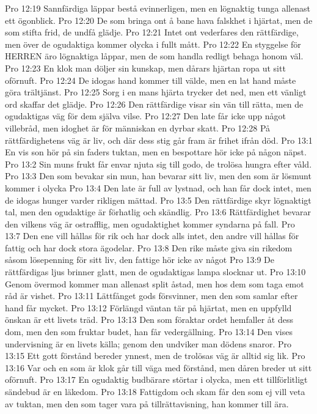 Pro 12:19  Sannfärdiga läppar bestå evinnerligen, men en lögnaktig tunga allenast ett ögonblick.
Pro 12:20  De som bringa ont å bane hava falskhet i hjärtat, men de som stifta frid, de undfå glädje.
Pro 12:21  Intet ont vederfares den rättfärdige, men över de ogudaktiga kommer olycka i fullt mått.
Pro 12:22  En styggelse för HERREN äro lögnaktiga låppar, men de som handla redligt behaga honom väl.
Pro 12:23  En klok man döljer sin kunskap, men dårars hjärtan ropa ut sitt oförnuft.
Pro 12:24  De idogas hand kommer till välde, men en lat hand måste göra trältjänst.
Pro 12:25  Sorg i en mans hjärta trycker det ned, men ett vänligt ord skaffar det glädje.
Pro 12:26  Den rättfärdige visar sin vän till rätta, men de ogudaktigas väg för dem själva vilse.
Pro 12:27  Den late får icke upp något villebråd, men idoghet är för människan en dyrbar skatt.
Pro 12:28  På rättfärdighetens väg är liv, och där dess stig går fram är frihet ifrån död.
Pro 13:1  En vis son hör på sin faders tuktan, men en bespottare hör icke på någon näpst.
Pro 13:2  Sin muns frukt får envar njuta sig till godo, de trolösa hungra efter våld.
Pro 13:3  Den som bevakar sin mun, han bevarar sitt liv, men den som är lösmunt kommer i olycka
Pro 13:4  Den late är full av lystnad, och han får dock intet, men de idogas hunger varder rikligen mättad.
Pro 13:5  Den rättfärdige skyr lögnaktigt tal, men den ogudaktige är förhatlig och skändlig.
Pro 13:6  Rättfärdighet bevarar den vilkens väg är ostrafflig, men ogudaktighet kommer syndarna på fall.
Pro 13:7  Den ene vill hållas för rik och har dock alls intet, den andre vill hållas för fattig och har dock stora ägodelar.
Pro 13:8  Den rike måste giva sin rikedom såsom lösepenning för sitt liv, den fattige hör icke av något
Pro 13:9  De rättfärdigas ljus brinner glatt, men de ogudaktigas lampa slocknar ut.
Pro 13:10  Genom övermod kommer man allenast split åstad, men hos dem som taga emot råd är vishet.
Pro 13:11  Lättfånget gods försvinner, men den som samlar efter hand får mycket.
Pro 13:12  Förlängd väntan tär på hjärtat, men en uppfylld önskan är ett livets träd.
Pro 13:13  Den som föraktar ordet hemfaller åt dess dom, men den som fruktar budet, han får vedergällning.
Pro 13:14  Den vises undervisning är en livets källa; genom den undviker man dödens snaror.
Pro 13:15  Ett gott förstånd bereder ynnest, men de trolösas väg är alltid sig lik.
Pro 13:16  Var och en som är klok går till väga med förstånd, men dåren breder ut sitt oförnuft.
Pro 13:17  En ogudaktig budbärare störtar i olycka, men ett tillförlitligt sändebud är en läkedom.
Pro 13:18  Fattigdom och skam får den som ej vill veta av tuktan, men den som tager vara på tillrättavisning, han kommer till ära.
